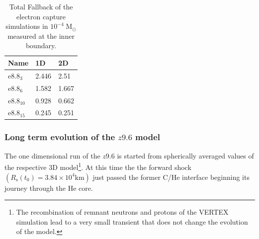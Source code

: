 \documentclass[fleqn,usenatbib]{mnras}
\newcommand{\vertex}{\textsc{V{\footnotesize ERTEX}}\xspace}
\begin{document}
\begin{table}
   \begin{tabular}{l| l | l }
  \label{table:e8Fallback}
  Name & 1D & 2D \\
  \hline \hline
  $\mathrm{e}8.8_{3}$ & 2.446 	&	 2.51  \\
  $\mathrm{e}8.8_{6}$ & 1.582 	& 	1.667  \\
  $\mathrm{e}8.8_{10}$ & 0.928	& 	0.662  \\
  $\mathrm{e}8.8_{15}$ & 0.245 & 	 0.251 \\
  \end{tabular}
\caption{Total Fallback of the electron capture simulations in $\mathrm{10^{-4}\;M_{\odot}}$ measured at the inner boundary. }
\end{table}

\subsubsection{Long term evolution of the $z9.6$ model}
\label{subsec:z96 1d}
The one dimensional run of the $z9.6$ is started from spherically averaged values of the respective 3D model\footnote{The recombination of remnant neutrons and protons of the \vertex simulation lead to a very small transient that does not change the evolution of the model.}. At this time the the forward shock $(R_{\mathrm{s}}(t_0) = 3.84\times 10^4 \mathrm{km})$ just passed the former C/He interface beginning its journey through the He core.
\end{document}
